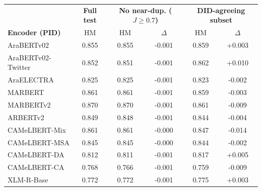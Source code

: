 \begin{tabular}{lc|cc|cc}
\toprule
 & \textbf{Full test} & \multicolumn{2}{c|}{\textbf{No near-dup. ($J{\ge}0.7$)}} & \multicolumn{2}{c}{\textbf{DID-agreeing subset}} \\
\textbf{Encoder (PID)} & HM & HM & $\Delta$ & HM & $\Delta$ \\
\midrule
AraBERTv02 & 0.855 & 0.855 & -0.001 & 0.859 & +0.003 \\
AraBERTv02-Twitter & 0.852 & 0.851 & -0.001 & 0.862 & +0.010 \\
AraELECTRA & 0.825 & 0.825 & -0.001 & 0.823 & -0.002 \\
MARBERT & 0.861 & 0.861 & -0.001 & 0.859 & -0.003 \\
MARBERTv2 & 0.870 & 0.870 & -0.001 & 0.861 & -0.009 \\
ARBERTv2 & 0.849 & 0.848 & -0.001 & 0.844 & -0.004 \\
CAMeLBERT-Mix & 0.861 & 0.861 & -0.000 & 0.847 & -0.014 \\
CAMeLBERT-MSA & 0.845 & 0.845 & -0.000 & 0.844 & -0.002 \\
CAMeLBERT-DA & 0.812 & 0.811 & -0.001 & 0.817 & +0.005 \\
CAMeLBERT-CA & 0.768 & 0.766 & -0.001 & 0.759 & -0.009 \\
XLM-R-Base & 0.772 & 0.772 & -0.001 & 0.775 & +0.003 \\
\bottomrule
\end{tabular}
